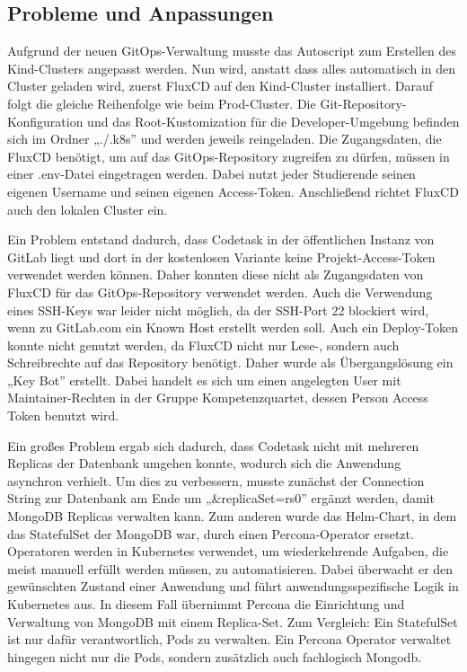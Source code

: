 \subsection{Probleme und Anpassungen}
Aufgrund der neuen GitOps-Verwaltung musste das Autoscript zum Erstellen des Kind-Clusters angepasst werden.
Nun wird, anstatt dass alles automatisch in den Cluster geladen wird, zuerst FluxCD auf den Kind-Cluster installiert.
Darauf folgt die gleiche Reihenfolge wie beim Prod-Cluster. Die Git-Repository-Konfiguration und das Root-Kustomization für die Developer-Umgebung befinden sich im Ordner „./.k8s” und werden jeweils reingeladen.
Die Zugangsdaten, die FluxCD benötigt, um auf das GitOps-Repository zugreifen zu dürfen, müssen in einer .env-Datei eingetragen werden. Dabei nutzt jeder Studierende seinen eigenen Username und seinen eigenen Access-Token.
Anschließend richtet FluxCD auch den lokalen Cluster ein.

Ein Problem entstand dadurch, dass Codetask in der öffentlichen Instanz von GitLab liegt und dort in der kostenlosen Variante keine Projekt-Access-Token verwendet werden können.
Daher konnten diese nicht als Zugangsdaten von FluxCD für das GitOps-Repository verwendet werden.
Auch die Verwendung eines SSH-Keys war leider nicht möglich, da der SSH-Port 22 blockiert wird, wenn zu GitLab.com ein Known Host erstellt werden soll.
Auch ein Deploy-Token konnte nicht genutzt werden, da FluxCD nicht nur Lese-, sondern auch Schreibrechte auf das Repository benötigt.
Daher wurde als Übergangslösung ein „Key Bot” erstellt. Dabei handelt es sich um einen angelegten User mit Maintainer-Rechten in der Gruppe Kompetenzquartet, dessen Person Access Token benutzt wird.

Ein großes Problem ergab sich dadurch, dass Codetask nicht mit mehreren Replicas der Datenbank umgehen konnte, wodurch sich die Anwendung asynchron verhielt.
Um dies zu verbessern, musste zunächst der Connection String zur Datenbank am Ende um „\&replicaSet=rs0” ergänzt werden, damit MongoDB Replicas verwalten kann.
Zum anderen wurde das Helm-Chart, in dem das StatefulSet der MongoDB war, durch einen Percona-Operator ersetzt. Operatoren werden in Kubernetes verwendet, um wiederkehrende Aufgaben, die meist manuell erfüllt werden müssen, zu automatisieren.
Dabei überwacht er den gewünschten Zustand einer Anwendung und führt anwendungsspezifische Logik in Kubernetes aus.
In diesem Fall übernimmt Percona die Einrichtung und Verwaltung von MongoDB mit einem Replica-Set.
Zum Vergleich: Ein StatefulSet ist nur dafür verantwortlich, Pods zu verwalten. Ein Percona Operator verwaltet hingegen nicht nur die Pods, sondern zusätzlich auch fachlogisch Mongodb.
